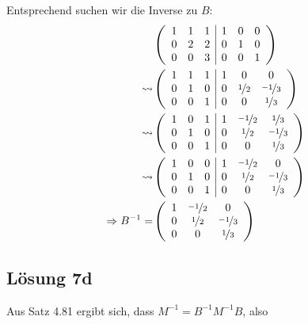 \documentclass[main.tex]{subfiles}
\begin{document}
Entsprechend suchen wir die Inverse zu $B$:
\begin{align*}
    & \eqmatrix{ccc|ccc}{
        1 & 1 & 1    &    1 & 0 & 0 \\
        0 & 2 & 2    &    0 & 1 & 0 \\
        0 & 0 & 3    &    0 & 0 & 1
    }\\
    \leadsto & \eqmatrix{ccc|ccc}{
        1 & 1 & 1    &    1 & 0   & 0 \\
        0 & 1 & 0    &    0 & \nicefrac{1}{2} & \nicefrac{-1}{3} \\
        0 & 0 & 1    &    0 & 0   & \nicefrac{1}{3}
    }\\
    \leadsto & \eqmatrix{ccc|ccc}{
        1 & 0 & 1    &    1 & \nicefrac{-1}{2} & \nicefrac{1}{3} \\
        0 & 1 & 0    &    0 & \nicefrac{1}{2}  & \nicefrac{-1}{3} \\
        0 & 0 & 1    &    0 & 0    & \nicefrac{1}{3}
    }\\
    \leadsto & \eqmatrix{ccc|ccc}{
        1 & 0 & 0    &    1 & \nicefrac{-1}{2} & 0 \\
        0 & 1 & 0    &    0 & \nicefrac{1}{2}  & \nicefrac{-1}{3} \\
        0 & 0 & 1    &    0 & 0    & \nicefrac{1}{3}
    }\\
    \Rightarrow B^{-1} = & \eqmatrix{ccc}{
        1 & \nicefrac{-1}{2} & 0 \\
        0 & \nicefrac{1}{2} & \nicefrac{-1}{3} \\
        0 & 0 & \nicefrac{1}{3}
    }\\
\end{align*}

\pagebreak
\subsection*{Lösung 7d}
Aus Satz 4.81 ergibt sich, dass $M^{-1} = B^{-1} M^{-1} B$, also
\end{document}
